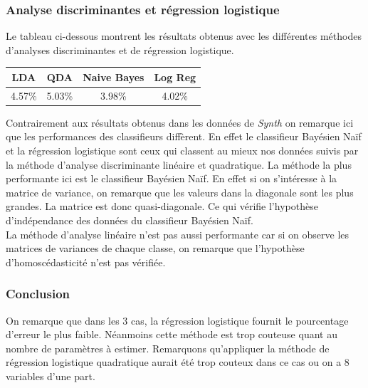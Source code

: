 \documentclass[10pt]{article}
\begin{document}
\subsubsection{Analyse discriminantes et régression logistique}
Le tableau ci-dessous montrent les résultats obtenus avec les différentes méthodes d'analyses discriminantes et de régression logistique.
\begin{center}
	\begin{tabular}{|c | c | c| c| }
		\hline
	LDA & QDA & Naive Bayes & Log Reg \\
	\hline	
	4.57\% & 5.03\% & 3.98\% & 4.02\%
	\end{tabular}
\end{center}

Contrairement aux résultats obtenus dans les données de \textit{Synth} on remarque ici que les performances des classifieurs diffèrent. En effet le classifieur Bayésien Naïf et la régression logistique sont ceux qui classent au mieux nos données suivis par la méthode d'analyse discriminante linéaire et quadratique. 
La méthode la plus performante ici est le classifieur Bayésien Naïf. En effet si on s'intéresse à la matrice de variance, on remarque que les valeurs dans la diagonale sont les plus grandes. La matrice est donc quasi-diagonale. Ce qui vérifie l'hypothèse d'indépendance des données du classifieur Bayésien Naïf. \\
La méthode d'analyse linéaire n'est pas aussi performante car si on observe les matrices de variances de chaque classe, on remarque que l'hypothèse d'homoscédasticité n'est pas vérifiée.

\subsubsection{Conclusion}
On remarque que dans les 3 cas, la régression logistique fournit le pourcentage d'erreur le plus faible. Néanmoins cette méthode est trop couteuse quant au nombre de paramètres à estimer. Remarquons qu'appliquer la méthode de régression logistique quadratique aurait été trop couteux dans ce cas ou on a 8 variables d'une part. 
\end{document}

